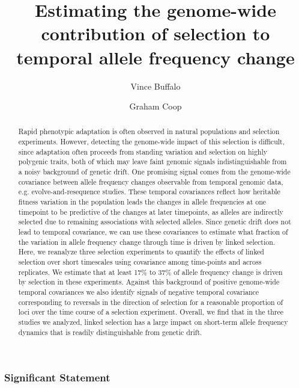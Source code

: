 \documentclass[11pt]{article}
\title{Estimating the genome-wide contribution of selection to temporal allele frequency change}
\author[$\ast$,$\dag$,$1$]{Vince Buffalo}
\author[$\dag$]{Graham Coop}
\affil[$\ast$]{\footnotesize Population Biology Graduate Group}
\affil[$\dag$]{\footnotesize Center for Population Biology, Department of Evolution and Ecology, University of California, Davis, CA 95616}
\affil[$1$]{\footnotesize Email for correspondence: \href{mailto:vsbuffalo@ucdavis.edu}{vsbuffalo@ucdavis.edu}}
\begin{document}
\maketitle

\linenumbers

\begin{abstract}

 Rapid phenotypic adaptation is often observed in natural populations and
 selection experiments.  However, detecting the genome-wide impact of this
 selection is difficult, since adaptation often proceeds from standing
 variation and selection on highly polygenic traits, both of which may leave
 faint genomic signals indistinguishable from a noisy background of genetic
 drift.  One promising signal comes from the genome-wide covariance between
 allele frequency changes observable from temporal genomic data, e.g.
 evolve-and-resequence studies. These temporal covariances reflect how
   heritable fitness variation in the population leads the changes in allele
   frequencies at one timepoint to be predictive of the changes at later
 timepoints, as alleles are indirectly selected due to remaining
 associations with selected alleles. Since genetic drift does not lead to
 temporal covariance, we can use these covariances to estimate what fraction of
 the variation in allele frequency change through time is driven by linked
 selection. Here, we reanalyze three selection experiments to quantify the
 effects of linked selection over short timescales using covariance among
 time-points and across replicates. We estimate that at least 17\% to 37\% of
 allele frequency change is driven by selection in these experiments.  Against
 this background of positive genome-wide temporal covariances we also identify
 signals of negative temporal covariance corresponding to reversals in the
 direction of selection for a reasonable proportion of loci over the time
 course of a selection experiment.  Overall, we find that in the three studies
 we analyzed, linked selection has a large impact on short-term allele
 frequency dynamics that is readily distinguishable from genetic drift.

\end{abstract}

\subsubsection*{Significant Statement}
\end{document}
